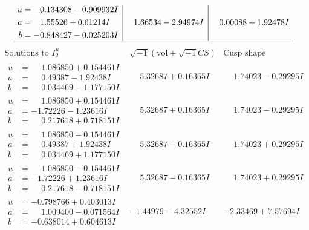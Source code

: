 \documentclass[1p]{elsarticle_modified}
\theoremstyle{definition}
\newcommand{\I}{\sqrt{-1}}
\begin{document}
$$\begin{array}{c|c|c}
\begin{aligned}
u &= -0.134308 - 0.909932 I \\
a &= \phantom{-}1.55526 + 0.61214 I \\
b &= -0.848427 - 0.025203 I\end{aligned}
 & \phantom{-}1.66534 - 2.94974 I & \phantom{-}0.00088 + 1.92478 I\\
 \hline 
 \end{array}$$\newpage$$\begin{array}{c|c|c}  
\text{Solutions to }I^u_{2}& \I (\text{vol} + \sqrt{-1}CS) & \text{Cusp shape}\\
 \hline 
\begin{aligned}
u &= \phantom{-}1.086850 + 0.154461 I \\
a &= \phantom{-}0.49387 - 1.92438 I \\
b &= \phantom{-}0.034469 - 1.177150 I\end{aligned}
 & \phantom{-}5.32687 + 0.16365 I & \phantom{-}1.74023 - 0.29295 I \\ \hline\begin{aligned}
u &= \phantom{-}1.086850 + 0.154461 I \\
a &= -1.72226 - 1.23616 I \\
b &= \phantom{-}0.217618 + 0.718151 I\end{aligned}
 & \phantom{-}5.32687 + 0.16365 I & \phantom{-}1.74023 - 0.29295 I \\ \hline\begin{aligned}
u &= \phantom{-}1.086850 - 0.154461 I \\
a &= \phantom{-}0.49387 + 1.92438 I \\
b &= \phantom{-}0.034469 + 1.177150 I\end{aligned}
 & \phantom{-}5.32687 - 0.16365 I & \phantom{-}1.74023 + 0.29295 I \\ \hline\begin{aligned}
u &= \phantom{-}1.086850 - 0.154461 I \\
a &= -1.72226 + 1.23616 I \\
b &= \phantom{-}0.217618 - 0.718151 I\end{aligned}
 & \phantom{-}5.32687 - 0.16365 I & \phantom{-}1.74023 + 0.29295 I \\ \hline\begin{aligned}
u &= -0.798766 + 0.403013 I \\
a &= \phantom{-}1.009400 - 0.071564 I \\
b &= -0.638014 + 0.604613 I\end{aligned}
 & -1.44979 - 4.32552 I & -2.33469 + 7.57694 I \\ \hline\begin{aligned}

\end{aligned}
\end{array}$$
\end{document}
